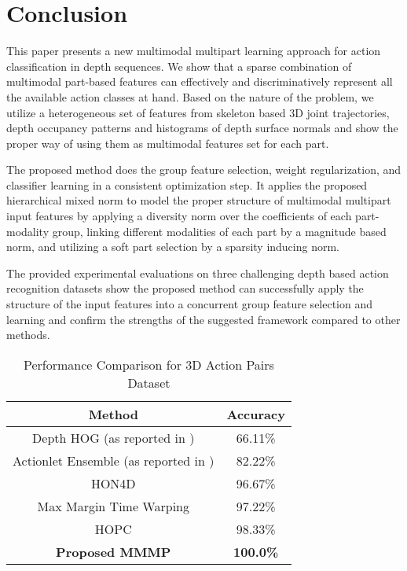 \documentclass[9pt,technote,compsoc]{IEEEtran}
\begin{document}
\section{Conclusion}

This paper presents a new multimodal multipart learning approach for action classification in depth sequences. We show that a sparse combination of multimodal part-based features can effectively and discriminatively represent all the available action classes at hand. Based on the nature of the problem, we utilize a heterogeneous set of features from skeleton based 3D joint trajectories, depth occupancy patterns and histograms of depth surface normals and show the proper way of using them as multimodal features set for each part.

The proposed method does the group feature selection, weight regularization, and classifier learning in a consistent optimization step. It applies the proposed hierarchical mixed norm to model the proper structure of multimodal multipart input features by applying a diversity norm over the coefficients of each part-modality group, linking different modalities of each part by a magnitude based norm, and utilizing a soft part selection by a sparsity inducing norm.

The provided experimental evaluations on three challenging depth based action recognition datasets show the proposed method can successfully apply the structure of the input features into a concurrent group feature selection and learning and confirm the strengths of the suggested framework compared to other methods.

\begin{table}[!t]
	\renewcommand{\arraystretch}{1.3}
	\caption{Performance Comparison for 3D Action Pairs Dataset}
	\label{table_3dactionpairs}
	\centering
	\begin{tabular}{|c||c|}
		\hline
		\bfseries Method & \bfseries Accuracy\\\hline
		\hline Depth HOG \cite{DHOG} (as reported in \cite{MMTW}) & 66.11\%\\
		\hline Actionlet Ensemble \cite{actionletPAMI} (as reported in \cite{MMTW}) & 82.22\%\\
		\hline HON4D \cite{HON4D} & 96.67\%\\
		\hline Max Margin Time Warping \cite{MMTW} & 97.22\%\\
		\hline HOPC \cite{HOPC} & 98.33\%\\
		\hline\hline
		{\bf Proposed MMMP} & {\bf 100.0\%}\\
		\hline
	\end{tabular}
\end{table}
\end{document}
